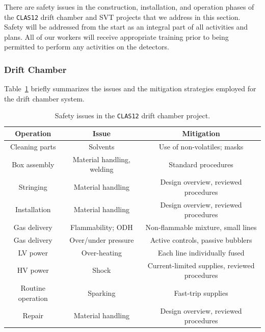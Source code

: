 There are safety issues in the construction, installation, and operation
phases of the {\tt CLAS12} drift chamber and SVT projects that we address 
in this section.  Safety will be addressed from the start as an integral 
part of all activities and plans.  All of our workers will receive 
appropriate training prior to being permitted to perform any activities 
on the detectors.

\subsubsection{Drift Chamber}

Table~\ref{dc-safety} briefly summarizes the issues and the mitigation 
strategies employed for the drift chamber system.

\begin{table}[htbp]
\begin{center}
\begin{small}
\begin{tabular} {||c|c|c||} \hline \hline
{\bf Operation} & {\bf Issue}     &  {\bf Mitigation} \\ \hline
Cleaning parts  & Solvents & Use of non-volatiles; masks \\ \hline
Box assembly & Material handling, welding & Standard procedures \\ \hline
Stringing & Material handling  & Design overview, reviewed procedures \\ \hline
Installation & Material handling & Design overview, reviewed procedures \\ \hline
Gas delivery      & Flammability; ODH & Non-flammable mixture, small lines \\ \hline
Gas delivery      & Over/under pressure & Active controls, passive bubblers \\ \hline
LV power          & Over-heating & Each line individually fused \\ \hline
HV power          & Shock & Current-limited supplies, reviewed procedures \\ \hline
Routine operation & Sparking & Fast-trip supplies \\ \hline
Repair & Material handling & Design overview, reviewed procedures \\ \hline \hline
\end{tabular}
\end{small}
\caption{\small{Safety issues in the {\tt CLAS12} drift chamber project.}}
\label{dc-safety}
\end{center}
\end{table}

